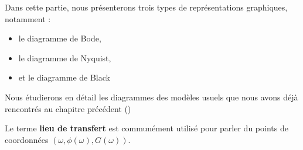Dans cette partie, nous présenterons trois types de représentations graphiques, 
notamment :
\begin{itemize}
    \item le diagramme de Bode,
    \item le diagramme de Nyquist,
    \item et le diagramme de Black
\end{itemize}
Nous étudierons en détail les diagrammes des modèles usuels que nous 
avons déjà rencontrés au chapitre précédent ()

Le terme \textbf{lieu de transfert} est communément utilisé pour parler du 
points de coordonnées $(\omega, \phi(\omega),G(\omega))$.
